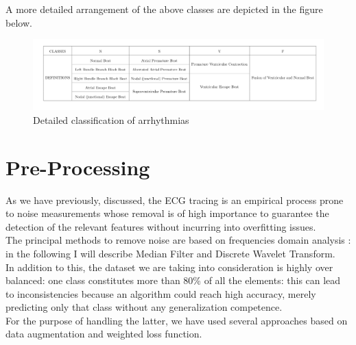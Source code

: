 \documentclass[LaM,binding=0.6cm]{sapthesis}
\begin{document}
A more detailed arrangement of the above classes are depicted in the figure below.
\begin{figure}[H]  \centering
	\includegraphics[width=150mm,scale=0.7]{allclass}
	\caption{Detailed classification of arrhythmias }
	\label{fig:allclass}
\end{figure}

\chapter{Pre-Processing}
As we have previously, discussed, the ECG tracing is an empirical process prone to noise measurements whose removal is of high importance to guarantee the detection of the relevant features without incurring into overfitting issues.\\The principal methods to remove noise are based on frequencies domain analysis : in the following I will describe Median Filter and Discrete Wavelet Transform.\\In addition to this, the dataset we are taking into consideration is highly over balanced: one class constitutes more than 80\% of all the elements: this can lead to inconsistencies because an algorithm could reach high accuracy, merely predicting only that class without any generalization competence.\\For the purpose of handling the latter, we have used several approaches based on data augmentation and weighted loss function. 
\end{document}
